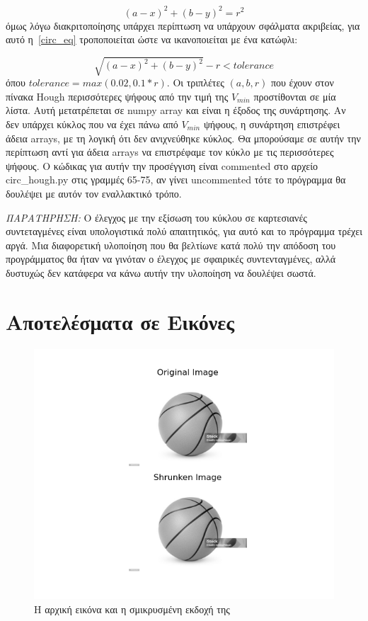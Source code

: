 \documentclass{article}
\begin{document}
\begin{equation}\label{circ_eq}
    (a - x)^2 + (b - y)^2 = r^2
\end{equation}
όμως λόγω διακριτοποίησης υπάρχει περίπτωση να υπάρχουν σφάλματα ακριβείας, για
αυτό η~\ref{circ_eq} τροποποι\-είται ώστε να ικανοποιείται με ένα κατώφλι:

\begin{equation}\label{circ_eq2}
    \sqrt{(a - x)^2 + (b - y)^2} - r < tolerance 
\end{equation}
όπου $tolerance = max(0.02, 0.1*r)$. Οι τριπλέτες $(a, b, r)$ που έχουν 
στον πίνακα Hough περισσότερες ψήφους από την τιμή της $V_{min}$ προστίθονται σε μία λίστα.
Αυτή μετατρέπεται σε numpy array και είναι η έξοδος της συνάρτησης. Αν
δεν υπάρχει κύκλος που να έχει πάνω από $V_{min}$ ψήφους, η συνάρτηση 
επιστρέφει άδεια arrays, με τη λογική ότι δεν ανιχνεύθηκε κύκλος. Θα μπορούσαμε 
σε αυτήν την περίπτωση αντί για άδεια arrays να επιστρέφαμε τον κύκλο με τις 
περισσότερες ψήφους. Ο κώδικας για αυτήν την προσέγγιση είναι commented στο 
αρχείο circ\_hough.py στις γραμμές 65-75, αν γίνει uncommented τότε το πρόγραμμα
θα δουλέψει με αυτόν τον εναλλακτικό τρόπο. 

\emph{ΠΑΡΑΤΗΡΗΣΗ:} Ο έλεγχος με την εξίσωση του κύκλου σε καρτεσιανές
συντεταγμένες είναι υπολογιστι\-κά πολύ απαιτητικός, για αυτό και το 
πρόγραμμα τρέχει αργά. Μια διαφορετική υλοποίηση που θα 
βελτίωνε κατά πολύ την απόδοση του προγράμματος θα ήταν να γινόταν ο 
έλεγχος με σφαιρικές συντενταγ\-μένες, αλλά δυστυχώς δεν κατάφερα να κάνω
αυτήν την υλοποίηση να δουλέψει σωστά.


\section{Αποτελέσματα σε Εικόνες}

\begin{figure}
    \centering
    \includegraphics[width=\textwidth]{origin_shrunk.png}
    \caption{Η αρχική εικόνα και η σμικρυσμένη εκδοχή της}\label{origin_shrunk}
\end{figure}
\end{document}
